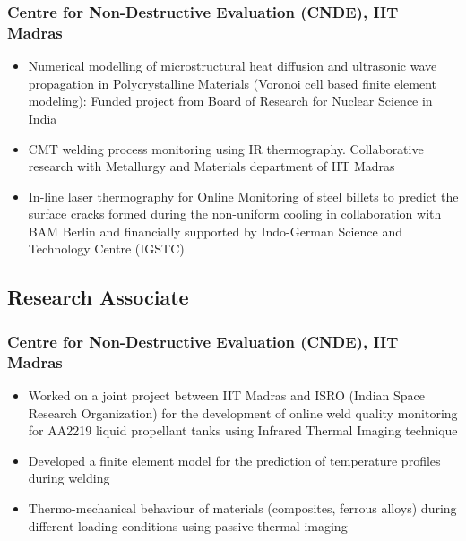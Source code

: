 \documentclass{my_cv}%
\begin{document}
\subsubsection{Centre for Non-Destructive Evaluation (CNDE), IIT Madras}
\begin{itemize}[leftmargin=0.15in]
\setlength\itemsep{-0.1em}
\color{mygray}
\item Numerical modelling of microstructural heat diffusion and ultrasonic wave propagation in Polycrystalline Materials (Voronoi cell based finite element modeling): Funded project from Board of Research for Nuclear Science in India
\item CMT welding process monitoring using IR thermography. Collaborative research with Metallurgy and Materials department of IIT Madras
\item In-line laser thermography for Online Monitoring of steel billets to predict the surface cracks formed during the non-uniform cooling in collaboration with BAM Berlin and financially supported by Indo-German Science and Technology Centre (IGSTC)
\end{itemize}
{\color{mygray1} \hdashrule[0.1ex]{18.8cm}{0.2mm}{1mm}}
\subsection{Research Associate}
\subsubsection{Centre for Non-Destructive Evaluation (CNDE), IIT Madras}
\begin{itemize}[leftmargin=0.15in]
\setlength\itemsep{-0.1em}
\color{mygray}
\item Worked on a joint project between IIT Madras and ISRO (Indian Space Research Organization) for the development of online weld quality monitoring for AA2219 liquid propellant tanks using Infrared Thermal Imaging technique
\item Developed a finite element model for the prediction of temperature profiles during welding
\item Thermo-mechanical behaviour of materials (composites, ferrous alloys) during different loading conditions using passive thermal imaging
\end{itemize}
\end{document}
